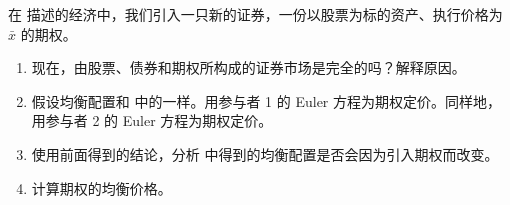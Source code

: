 \par\noindent\begin{minipage}{\linewidth}
\begin{problem}
 在 描述的经济中，我们引入一只新的证券，一份以股票为标的资产、执行价格为 $\bar{x}$ 的期权。
\begin{enumerate}[label=(\alph*)]
    \item 现在，由股票、债券和期权所构成的证券市场是完全的吗？解释原因。
    \item 假设均衡配置和 中的一样。用参与者 1 的 Euler 方程为期权定价。同样地，用参与者 2 的 Euler 方程为期权定价。
    \item 使用前面得到的结论，分析 中得到的均衡配置是否会因为引入期权而改变。
    \item 计算期权的均衡价格。
\end{enumerate}
\end{problem}
\end{minipage}\par
{}
